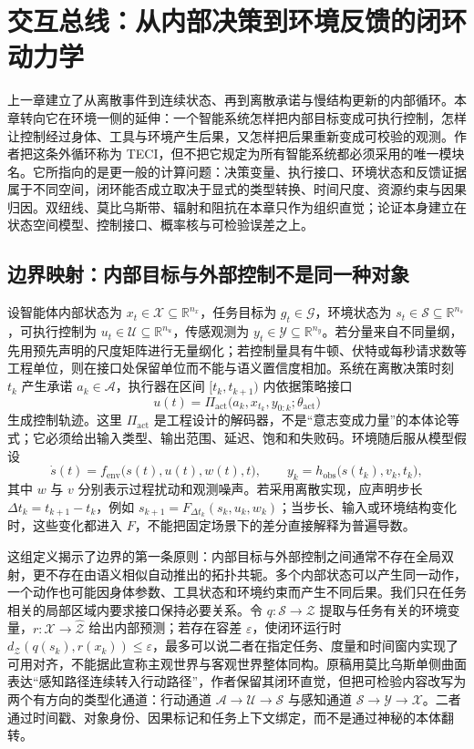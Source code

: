 \chapter{交互总线：从内部决策到环境反馈的闭环动力学}
\label{chp:interaction_bus_ch}

\label{chp:teci_cycle}
上一章建立了从离散事件到连续状态、再到离散承诺与慢结构更新的内部循环。本章转向它在环境一侧的延伸：一个智能系统怎样把内部目标变成可执行控制，怎样让控制经过身体、工具与环境产生后果，又怎样把后果重新变成可校验的观测。作者把这条外循环称为 TECI，但不把它规定为所有智能系统都必须采用的唯一模块名。它所指向的是更一般的计算问题：决策变量、执行接口、环境状态和反馈证据属于不同空间，闭环能否成立取决于显式的类型转换、时间尺度、资源约束与因果归因。双纽线、莫比乌斯带、辐射和阻抗在本章只作为组织直觉；论证本身建立在状态空间模型、控制接口、概率核与可检验误差之上。

\section{边界映射：内部目标与外部控制不是同一种对象}
\label{sec:section_6104}

设智能体内部状态为 $x_t\in\mathcal X\subseteq\mathbb R^{n_x}$，任务目标为 $g_t\in\mathcal G$，环境状态为 $s_t\in\mathcal S\subseteq\mathbb R^{n_s}$，可执行控制为 $u_t\in\mathcal U\subseteq\mathbb R^{n_u}$，传感观测为 $y_t\in\mathcal Y\subseteq\mathbb R^{n_y}$。若分量来自不同量纲，先用预先声明的尺度矩阵进行无量纲化；若控制量具有牛顿、伏特或每秒请求数等工程单位，则在接口处保留单位而不能与语义置信度相加。系统在离散决策时刻 $t_k$ 产生承诺 $a_k\in\mathcal A$，执行器在区间 $[t_k,t_{k+1})$ 内依据策略接口
\[
u(t)=\Pi_{\mathrm{act}}\bigl(a_k,x_{t_k},y_{0:k};\theta_{\mathrm{act}}\bigr)
\]
生成控制轨迹。这里 $\Pi_{\mathrm{act}}$ 是工程设计的解码器，不是“意志变成力量”的本体论等式；它必须给出输入类型、输出范围、延迟、饱和和失败码。环境随后服从模型假设
\[
\dot s(t)=f_{\mathrm{env}}\bigl(s(t),u(t),w(t),t\bigr),\qquad
y_k=h_{\mathrm{obs}}\bigl(s(t_k),v_k,t_k\bigr),
\]
其中 $w$ 与 $v$ 分别表示过程扰动和观测噪声。若采用离散实现，应声明步长 $\Delta t_k=t_{k+1}-t_k$，例如 $s_{k+1}=F_{\Delta t_k}(s_k,u_k,w_k)$；当步长、输入或环境结构变化时，这些变化都进入 $F$，不能把固定场景下的差分直接解释为普遍导数。

这组定义揭示了边界的第一条原则：内部目标与外部控制之间通常不存在全局双射，更不存在由语义相似自动推出的拓扑共轭。多个内部状态可以产生同一动作，一个动作也可能因身体参数、工具状态和环境约束而产生不同后果。我们只在任务相关的局部区域内要求接口保持必要关系。令 $q:\mathcal S\to\mathcal Z$ 提取与任务有关的环境变量，$r:\mathcal X\to\widehat{\mathcal Z}$ 给出内部预测；若存在容差 $\varepsilon$，使闭环运行时 $d_{\mathcal Z}(q(s_k),r(x_k))\leq\varepsilon$，最多可以说二者在指定任务、度量和时间窗内实现了可用对齐，不能据此宣称主观世界与客观世界整体同构。原稿用莫比乌斯单侧曲面表达“感知路径连续转入行动路径”，作者保留其闭环直觉，但把可检验内容改写为两个有方向的类型化通道：行动通道 $\mathcal A\to\mathcal U\to\mathcal S$ 与感知通道 $\mathcal S\to\mathcal Y\to\mathcal X$。二者通过时间戳、对象身份、因果标记和任务上下文绑定，而不是通过神秘的本体翻转。

